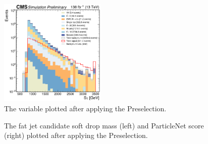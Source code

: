 \begin{figure}[htb]
    \centering
    \includegraphics[width=0.45\textwidth]{fig/vbswh/ST_sig_vs_bkg_stacked_logy_presel_noDetaJJ.pdf}
    \caption{
        The variable \ST plotted after applying the Preselection.
    }
    \label{fig:vbswh_presel_st}
\end{figure}

\begin{figure}[htb]
    \centering
    \qquad
    \caption{
        The \Htobb fat jet candidate soft drop mass (left) and ParticleNet \Xtobb score (right) plotted after applying the Preselection.
    }
    \label{fig:vbswh_presel_hbb}
\end{figure}

